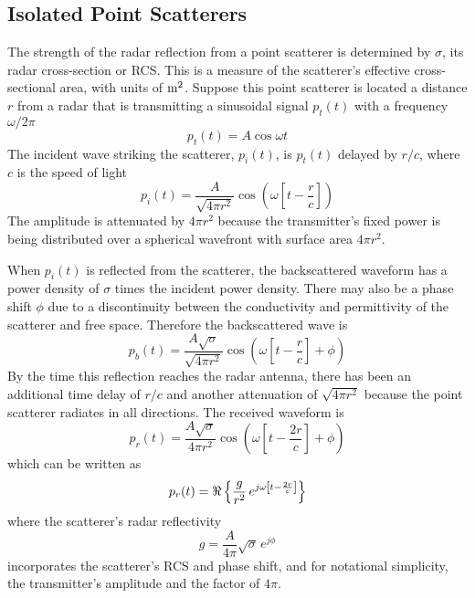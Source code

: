 \subsection{Isolated Point Scatterers}


The strength of the radar reflection from a point scatterer is determined by
$\sigma$, its radar cross-section or RCS.  This is a measure of the
scatterer's effective cross-sectional area, with units of ${\rm m}^2$.
Suppose this point scatterer is located a distance $r$ from a radar that is
transmitting a sinusoidal signal $p_t(t)$ with a frequency $\omega/2\pi$
\begin{equation}\label{hrr eqn:pt(t)}
p_t(t)=A\cos\omega t
\end{equation}
The incident wave striking the scatterer, $p_i(t)$, is $p_t(t)$ delayed by 
$r/c$, where $c$ is the speed of light
\begin{equation}
p_i(t)=\frac{A}{\sqrt{4\pi r^2}}\cos\left(\omega\left[t-\frac{r}{c}\right]
\right)
\end{equation}
The amplitude is attenuated by $4\pi r^2$ because the transmitter's fixed 
power is being distributed over a spherical wavefront with surface area 
$4\pi r^2$.

When $p_i(t)$ is reflected from the scatterer, the backscattered waveform
has a power density of $\sigma$ times the incident power density.  There may 
also be a phase shift $\phi$ due to a discontinuity between the conductivity 
and permittivity of the scatterer and free space.  Therefore the 
backscattered wave is
\begin{equation}
p_b(t)=\frac{A\sqrt{\sigma}}{\sqrt{4\pi r^2}}
\cos\left(\omega\left[t-\frac{r}{c}\right]+\phi\right)
\end{equation}
By the time this reflection reaches the radar antenna, there has been an
additional time delay of $r/c$ and another attenuation of $\sqrt{4\pi r^2}$
because the point scatterer radiates in all directions.  The received
waveform is
\begin{equation}
p_r(t)=\frac{A\sqrt{\sigma}}{4\pi r^2}
\cos\left(\omega\left[t-\frac{2r}{c}\right]+\phi\right)
\end{equation}
which can be written as
\begin{equation}
p_r(t)=\Re\left\{\frac{g}{r^2}\,e^{j\omega\left[t-\frac{2r}{c}\right]}\right\}
\end{equation}
where the scatterer's radar reflectivity 
\begin{equation}
g=\frac{A}{4\pi}\sqrt{\sigma}\,e^{j\phi}
\end{equation}
incorporates the scatterer's RCS and phase shift, and for notational
simplicity, the transmitter's amplitude and the factor of $4\pi$.


